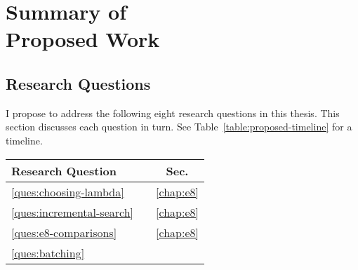 \chapter[Summary of Proposed Work]{Summary of\\Proposed Work}
\label{chap:proposed}

\section{Research Questions}
\label{sec:research-questions}

I propose to address the following eight research questions
in this thesis.
This section discusses each question in turn.
See Table~\ref{table:proposed-timeline} for a timeline.

\begin{center}
{\setlength{\tabcolsep}{3pt}
\begin{tabular}{llc}
\toprule
   \multicolumn{2}{l}{Research Question}
      & Sec. \\
\midrule
   \ref{ques:choosing-lambda}
      &
      \begin{minipage}[c]{0.83\columnwidth}%
      \vspace{0.05in}
      \begin{spacing}{0.7}
      \nameref{ques:choosing-lambda}
      \end{spacing}%
      \vspace{0in}
      \end{minipage}%
      & \ref{chap:e8} \\[20pt]
   \ref{ques:incremental-search}
      &
      \begin{minipage}[c]{0.83\columnwidth}%
      \begin{spacing}{0.7}
      \nameref{ques:incremental-search}
      \end{spacing}%
      \vspace{0in}
      \end{minipage}%
      & \ref{chap:e8} \\[12pt]
   \ref{ques:e8-comparisons}
      &
      \begin{minipage}[c]{0.83\columnwidth}%
      \begin{spacing}{0.7}
      \nameref{ques:e8-comparisons}
      \end{spacing}%
      \vspace{0in}
      \end{minipage}%
      & \ref{chap:e8} \\[12pt]
   \ref{ques:batching}
      &

\end{tabular}}
\end{center}

